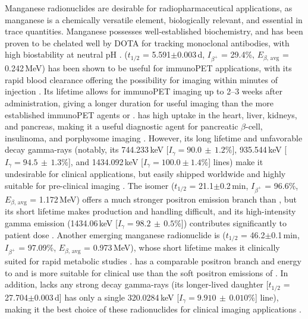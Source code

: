 Manganese radionuclides are desirable for radiopharmaceutical applications, as manganese is a chemically versatile element, biologically relevant, and essential in trace quantities. 
Manganese possesses well-established biochemistry, and has been proven to be chelated well by DOTA for tracking monoclonal antibodies, with high biostability at neutral pH \cite{Graves2015}.
 ($t_{1/2}$ = 5.591$\pm$0.003\,d, $I_{\beta^+}$ = 29.4\%, $E_{\beta\text{, avg}}$ = 0.242\,MeV) has been shown to be useful for immunoPET applications, with its rapid blood clearance offering the possibility for imaging within minutes of injection \cite{Dong2015}.
Its lifetime allows for immunoPET imaging up to 2--3 weeks after administration, giving  a longer duration for useful imaging  than the more established immunoPET agents  or   . 
  has high uptake in the heart, liver, kidneys, and pancreas, making it a useful diagnostic agent for pancreatic $\beta$-cell, insulinoma, and porphysome imaging \cite{Graves2015}. 
However, its  long lifetime and unfavorable decay gamma-rays (notably, its  744.233\,keV [$I_\gamma = 90.0\,\pm\,1.2\%$], 935.544\,keV [$I_\gamma = 94.5\,\pm\,1.3\%$], and 1434.092\,keV [$I_\gamma = 100.0 \pm 1.4\%$] lines) make it undesirable for clinical applications, but easily shipped worldwide and highly suitable for pre-clinical imaging \cite{Dong2015}.
The  isomer ($t_{1/2}$ = 21.1$\pm$0.2\,min, $I_{\beta^+}$ = 96.6\%, $E_{\beta\text{, avg}}$ = 1.172\,MeV) offers a much stronger positron emission branch than , but its short lifetime makes production and handling difficult, and its  high-intensity gamma emission (1434.06\,keV [$I_\gamma = 98.2\,\pm\,0.5\%$]) contributes significantly to patient dose  \cite{Dong2015}.
Another emerging manganese radionuclide is  ($t_{1/2}$ = 46.2$\pm$0.1\,min, $I_{\beta^+}$ = 97.09\%, $E_{\beta\text{, avg}}$ = 0.973\,MeV), whose short lifetime makes it clinically suited for rapid metabolic studies \cite{Wang2017}.
 has a comparable positron branch and energy to  and is more suitable for clinical use than the soft positron emissions of . 
In addition,  lacks any strong decay gamma-rays (its longer-lived daughter  [$t_{1/2}$ = 27.704$\pm$0.003\,d] has only a single  320.0284\,keV [$I_\gamma = 9.910\,\pm\,0.010\%$] line), making it the best choice of these radionuclides for clinical imaging applications \cite{Wang2017}.








